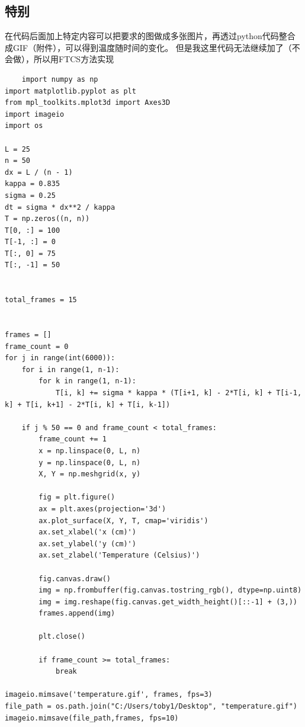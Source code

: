 \documentclass[12pt, a4paper, oneside]{ctexart}
\begin{document}
\begin{spacing}{2.0}
\section{特别}
在代码后面加上特定内容可以把要求的图做成多张图片，再透过python代码整合成GIF（附件），可以得到温度随时间的变化。
但是我这里代码无法继续加了（不会做），所以用FTCS方法实现
\begin{lstlisting}
    import numpy as np
import matplotlib.pyplot as plt
from mpl_toolkits.mplot3d import Axes3D
import imageio
import os

L = 25 
n = 50 
dx = L / (n - 1) 
kappa = 0.835  
sigma = 0.25  
dt = sigma * dx**2 / kappa 
T = np.zeros((n, n))
T[0, :] = 100
T[-1, :] = 0 
T[:, 0] = 75
T[:, -1] = 50


total_frames = 15


frames = []
frame_count = 0
for j in range(int(6000)):
    for i in range(1, n-1):
        for k in range(1, n-1):
            T[i, k] += sigma * kappa * (T[i+1, k] - 2*T[i, k] + T[i-1, k] + T[i, k+1] - 2*T[i, k] + T[i, k-1])

    if j % 50 == 0 and frame_count < total_frames:
        frame_count += 1
        x = np.linspace(0, L, n)
        y = np.linspace(0, L, n)
        X, Y = np.meshgrid(x, y)

        fig = plt.figure()
        ax = plt.axes(projection='3d')
        ax.plot_surface(X, Y, T, cmap='viridis')
        ax.set_xlabel('x (cm)')
        ax.set_ylabel('y (cm)')
        ax.set_zlabel('Temperature (Celsius)')

        fig.canvas.draw()
        img = np.frombuffer(fig.canvas.tostring_rgb(), dtype=np.uint8)
        img = img.reshape(fig.canvas.get_width_height()[::-1] + (3,))
        frames.append(img)

        plt.close()

        if frame_count >= total_frames:
            break

imageio.mimsave('temperature.gif', frames, fps=3)
file_path = os.path.join("C:/Users/toby1/Desktop", "temperature.gif")
imageio.mimsave(file_path,frames, fps=10)





\end{lstlisting}



\end{spacing}{}
\end{document}
